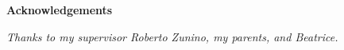 \thispagestyle{empty}

\begin{center}
  {\bf \Huge Acknowledgements}
\end{center}

\vspace{4cm}


\emph{
  Thanks to my supervisor Roberto Zunino, my parents, and Beatrice.
}
